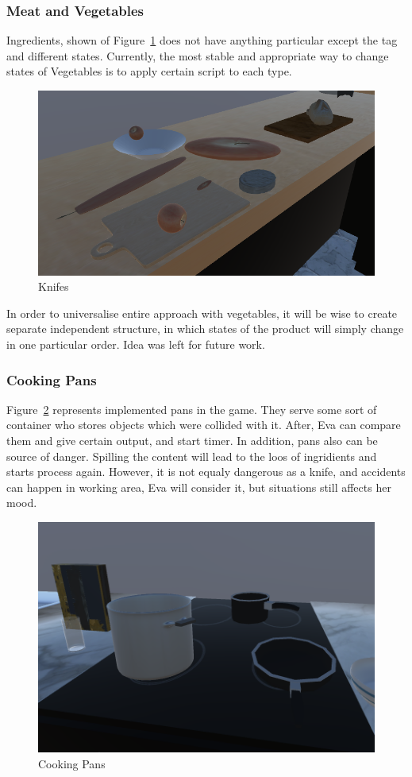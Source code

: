 \documentclass[18pt]{article}
\numberwithin{equation}{section} %
\numberwithin{figure}{section} %
\numberwithin{table}{section} %
\begin{document}
	\subsubsection{Meat and Vegetables}
	Ingredients, shown of Figure~\ref{fig:food} does not have anything particular except the tag and different states. Currently, the most stable and appropriate way to change states of Vegetables is to apply certain script to each type. \\
		\begin{figure}[H]
			\centering
			\includegraphics[width=0.5\linewidth]{images/food}
			\caption{Knifes}
			\label{fig:food}
		\end{figure}
	In order to universalise entire approach with vegetables, it will be wise to create separate independent structure, in which states of the product will simply change in one particular order. Idea was left for future work. \\
	\subsubsection{Cooking Pans}
	Figure~\ref{fig:pans} represents implemented pans in the game. They serve some sort of container who stores objects which were collided with it. After, Eva can compare them and give certain output, and start timer. In addition, pans also can be source of danger. Spilling the content will lead to the loos of ingridients and starts process again. However, it is not equaly dangerous as a knife, and accidents can happen in working area, Eva will consider it, but situations still affects her mood.
		\begin{figure}[H]
			\centering
			\includegraphics[width=0.5\linewidth]{images/pans}
			\caption{Cooking Pans}
			\label{fig:pans}
		\end{figure}
	
\end{document}
